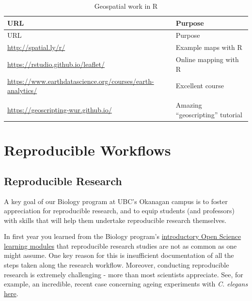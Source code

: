 \documentclass[
]{book}
\begin{document}
\begin{longtable}[]{@{}
  >{\raggedright\arraybackslash}p{}
  >{\raggedright\arraybackslash}p{}@{}}
\caption{Geospatial work in R}\tabularnewline
\toprule\noalign{}
\begin{minipage}[b]{\linewidth}\raggedright
URL
\end{minipage} & \begin{minipage}[b]{\linewidth}\raggedright
Purpose
\end{minipage} \\
\midrule\noalign{}
\endfirsthead
\toprule\noalign{}
\begin{minipage}[b]{\linewidth}\raggedright
URL
\end{minipage} & \begin{minipage}[b]{\linewidth}\raggedright
Purpose
\end{minipage} \\
\midrule\noalign{}
\endhead
\bottomrule\noalign{}
\endlastfoot
\url{http://spatial.ly/r/} & Example maps with R \\
\url{https://rstudio.github.io/leaflet/} & Online mapping with R \\
\url{https://www.earthdatascience.org/courses/earth-analytics/} & Excellent course \\
& \\
\url{https://geoscripting-wur.github.io/} & Amazing ``geoscripting'' tutorial \\
\end{longtable}

\part*{Reproducible Workflows}\label{part-reproducible-workflows}

\chapter{Reproducible Research}\label{repro_research}

A key goal of our Biology program at UBC's Okanagan campus is to foster appreciation for reproducible research, and to equip students (and professors) with skills that will help them undertake reproducible research themselves.

In first year you learned from the Biology program's \href{https://ubco-biology.github.io/OS-Introduction/}{introductory Open Science learning modules} that reproducible research studies are not as common as one might assume. One key reason for this is insufficient documentation of all the steps taken along the research workflow. Moreover, conducting reproducible research is extremely challenging - more than most scientists appreciate. See, for example, an incredible, recent case concerning ageing experiments with \emph{C. elegans} \href{https://www.nature.com/news/a-long-journey-to-reproducible-results-1.22478}{here}.
\end{document}
